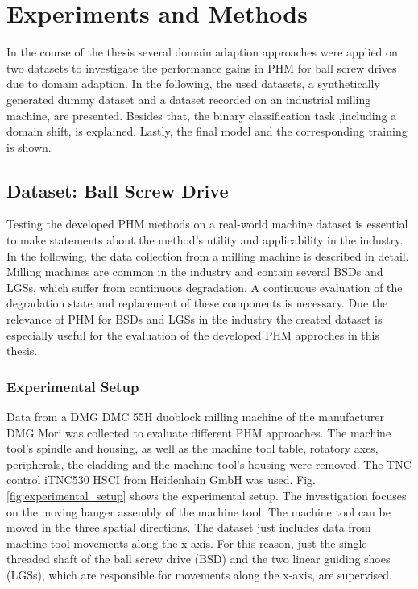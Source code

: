 \chapter{Experiments and Methods}\label{chapter:experiments}
In the course of the thesis several domain adaption approaches were applied on two datasets to investigate the performance gains in PHM for ball screw drives due to domain adaption. In the following, the used datasets, a synthetically generated dummy dataset and a dataset recorded on an industrial milling machine, are presented. Besides that, the binary classification task ,including a domain shift, is explained. Lastly, the final model and the corresponding training is shown.

\section{Dataset: Ball Screw Drive}
Testing the developed PHM methods on a real-world machine dataset is essential to make statements about the method's utility and applicability in the industry. In the following, the data collection from a milling machine is described in detail. Milling machines are common in the industry and contain several BSDs and LGSs, which suffer from continuous degradation. A continuous evaluation of the degradation state and replacement of these components is necessary. Due the relevance of PHM for BSDs and LGSs in the industry the created dataset is especially useful for the evaluation of the developed PHM approches in this thesis.

\subsection{Experimental Setup}
Data from a DMG DMC 55H duoblock milling machine of the manufacturer DMG Mori was collected to evaluate different PHM approaches. The machine tool’s spindle and housing, as well as the machine tool table, rotatory axes, peripherals, the cladding and the machine tool's housing were removed. The TNC control iTNC530 HSCI from Heidenhain GmbH was used. Fig. \ref{fig:experimental_setup} shows the experimental setup. The investigation focuses on the moving hanger assembly of the machine tool. The machine tool can be moved in the three spatial directions. The dataset just includes data from machine tool movements along the x-axis. For this reason, just the single threaded shaft of the ball screw drive (BSD) and the two linear guiding shoes (LGSs), which are responsible for movements along the x-axis, are supervised.

